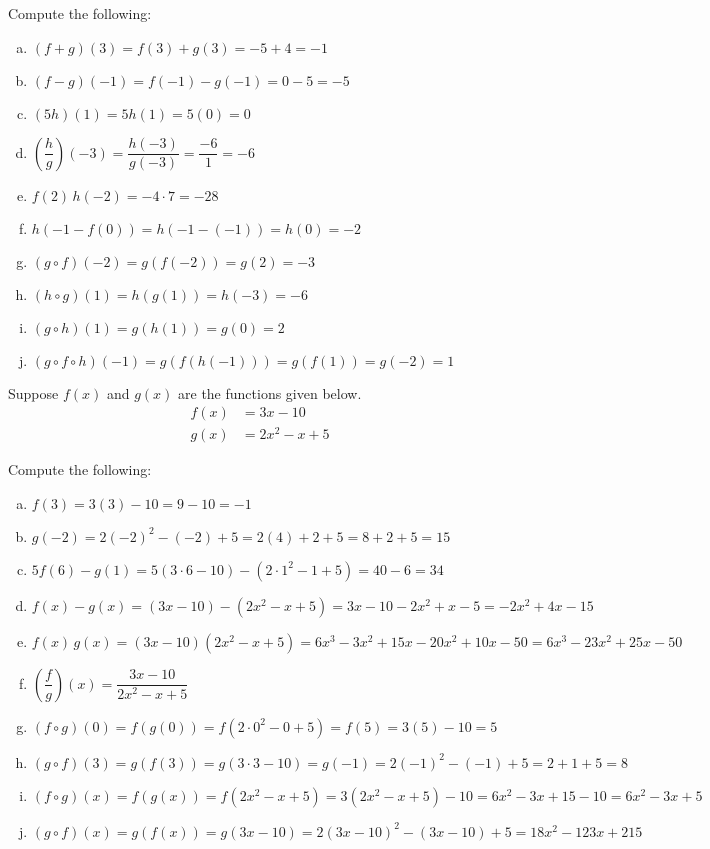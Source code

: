 \documentclass[11pt,letterpaper]{article}
\begin{document}
Compute the following: \pspace
        \begin{enumerate}[(a)]
        \item $(f + g)(3)= f(3) + g(3)= -5 + 4= -1$ \vfill
        \item $(f - g)(-1)= f(-1) - g(-1)= 0 - 5= -5$ \vfill
        \item $(5h)(1)= 5h(1)= 5(0)= 0$ \vfill
        \item $\left(\dfrac{h}{g}\right)(-3)= \dfrac{h(-3)}{g(-3)}= \dfrac{-6}{1}= -6$ \vfill
        \item $f(2)\, h(-2)= -4 \cdot 7= -28$ \vfill
        \item $h(-1 - f(0))= h(-1 - (-1))= h(0)= -2$ \vfill
        \item $(g \circ f)(-2)= g(f(-2))= g(2)= -3$ \vfill
	\item $(h \circ g)(1)= h(g(1))= h(-3)= -6$ \vfill
        \item $(g \circ h)(1)= g(h(1))= g(0)= 2$ \vfill
	\item $(g \circ f \circ h)(-1)= g(f(h(-1)))= g(f(1))= g(-2)= 1$ \vfill
        \end{enumerate} \pspace



\newpage



 Suppose $f(x)$ and $g(x)$ are the functions given below. 
	\[
	\begin{aligned}
	f(x)&= 3x - 10 \\[0.3cm]
	g(x)&= 2x^2 - x + 5
	\end{aligned}
	\]

Compute the following: \pspace
\begin{enumerate}[(a)]
\item $f(3)= 3(3) - 10= 9 - 10= -1$ \vfill
\item $g(-2)= 2(-2)^2 - (-2) + 5= 2(4) + 2 + 5= 8 + 2 + 5= 15$ \vfill
\item $5f(6) - g(1)= 5 (3 \cdot 6 - 10) - (2 \cdot 1^2 - 1 + 5)= 40 - 6= 34$ \vfill
\item $f(x) - g(x)= (3x - 10) - (2x^2 - x + 5)= 3x - 10 - 2x^2 + x - 5= -2x^2 +4x -15 $ \vfill
\item $f(x) \, g(x)= (3x - 10)(2x^2 - x + 5)= 6x^3 - 3x^2 + 15x - 20x^2 + 10x - 50= 6x^3 - 23x^2 + 25x - 50$ \vfill
\item $\left( \dfrac{f}{g} \right)(x)=\dfrac{3x - 10}{2x^2 - x + 5}$ \vfill
\item $(f \circ g)(0)= f(g(0))= f(2 \cdot 0^2 - 0 + 5)= f(5)= 3(5) - 10= 5$ \vfill
\item $(g \circ f)(3)= g(f(3))= g(3 \cdot 3 - 10)= g(-1)= 2(-1)^2 - (-1) + 5= 2 + 1 + 5= 8$ \vfill
\item $(f \circ g)(x)= f(g(x))= f(2x^2 - x + 5)= 3(2x^2 - x + 5) - 10= 6x^2 - 3x + 15 - 10= 6x^2 - 3x + 5$ \vfill
\item $(g \circ f)(x)= g(f(x))= g(3x - 10)= 2(3x - 10)^2 - (3x - 10) + 5= 18x^2 - 123x + 215$ \vfill
\end{enumerate} \pspace
\end{document}
